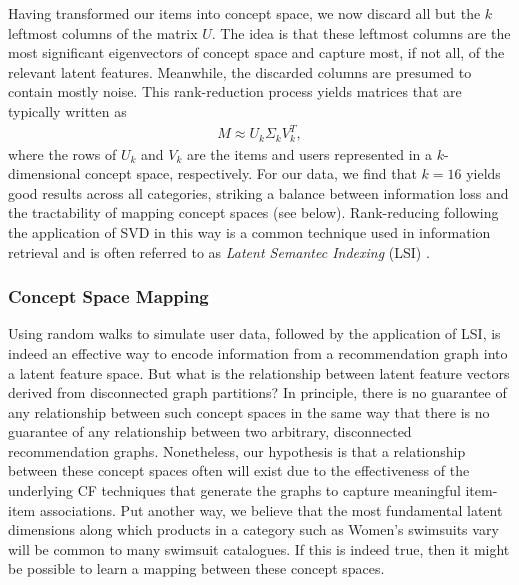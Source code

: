 \documentclass[11pt]{article}
\begin{document}
Having transformed our items into concept space, we now discard all but the $k$
leftmost columns of the matrix $U$. The idea is that these leftmost columns are
the most significant eigenvectors of concept space and capture most, if not all,
of the relevant latent features. Meanwhile, the discarded columns are presumed
to contain mostly noise. This rank-reduction process yields matrices that are
typically written as
\begin{align}
M \approx U_k \Sigma_k V^T_k,
\end{align}
where the rows of $U_k$ and $V_k$ are the items and users represented in a
$k$-dimensional concept space, respectively. For our data, we find that $k=16$
yields good results across all categories, striking a balance between
information loss and the tractability of mapping concept spaces (see below).
Rank-reducing following the application of SVD in this way is a common technique
used in information retrieval and is often referred to as {\em Latent Semantec
Indexing} (LSI) \cite{Deerwester1990}.

\subsubsection*{Concept Space Mapping}
Using random walks to simulate user data, followed by the application of LSI, is
indeed an effective way to encode information from a recommendation graph into a
latent feature space. But what is the relationship between latent feature
vectors derived from disconnected graph partitions? In principle, there is no
guarantee of any relationship between such concept spaces in the same way that
there is no guarantee of any relationship between two arbitrary, disconnected
recommendation graphs. Nonetheless, our hypothesis is that a relationship
between these concept spaces often will exist due to the effectiveness of the
underlying CF techniques that generate the graphs to capture meaningful
item-item associations. Put another way, we believe that the most fundamental
latent dimensions along which products in a category such as Women's swimsuits
vary will be common to many swimsuit catalogues. If this is indeed true, then it
might be possible to learn a mapping between these concept spaces.
\end{document}
